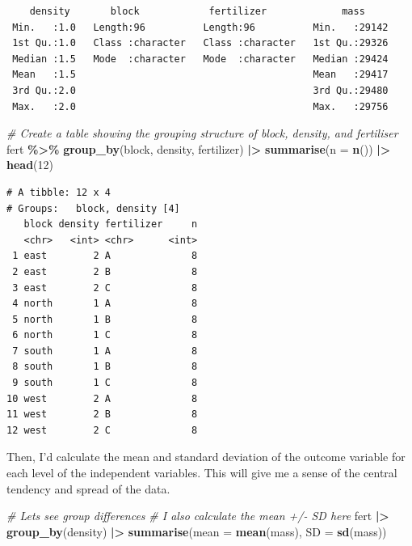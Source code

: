 \documentclass[
  10t,
]{article}
\newenvironment{Shaded}{\begin{snugshade}}{\end{snugshade}}
\newcommand{\AttributeTok}[1]{\textcolor[rgb]{0.13,0.29,0.53}{#1}}
\newcommand{\CommentTok}[1]{\textcolor[rgb]{0.56,0.35,0.01}{\textit{#1}}}
\newcommand{\DecValTok}[1]{\textcolor[rgb]{0.00,0.00,0.81}{#1}}
\newcommand{\FunctionTok}[1]{\textcolor[rgb]{0.13,0.29,0.53}{\textbf{#1}}}
\newcommand{\NormalTok}[1]{#1}
\newcommand{\SpecialCharTok}[1]{\textcolor[rgb]{0.81,0.36,0.00}{\textbf{#1}}}
\begin{document}
\begin{verbatim}
    density       block            fertilizer             mass      
 Min.   :1.0   Length:96          Length:96          Min.   :29142  
 1st Qu.:1.0   Class :character   Class :character   1st Qu.:29326  
 Median :1.5   Mode  :character   Mode  :character   Median :29424  
 Mean   :1.5                                         Mean   :29417  
 3rd Qu.:2.0                                         3rd Qu.:29480  
 Max.   :2.0                                         Max.   :29756  
\end{verbatim}

\begin{Shaded}
\begin{Highlighting}[]
\CommentTok{\# Create a table showing the grouping structure of block, density, and fertiliser}
\NormalTok{fert }\SpecialCharTok{\%\textgreater{}\%}
  \FunctionTok{group\_by}\NormalTok{(block, density, fertilizer) }\SpecialCharTok{|\textgreater{}} 
  \FunctionTok{summarise}\NormalTok{(}\AttributeTok{n =} \FunctionTok{n}\NormalTok{()) }\SpecialCharTok{|\textgreater{}} 
  \FunctionTok{head}\NormalTok{(}\DecValTok{12}\NormalTok{)}
\end{Highlighting}
\end{Shaded}

\begin{verbatim}
# A tibble: 12 x 4
# Groups:   block, density [4]
   block density fertilizer     n
   <chr>   <int> <chr>      <int>
 1 east        2 A              8
 2 east        2 B              8
 3 east        2 C              8
 4 north       1 A              8
 5 north       1 B              8
 6 north       1 C              8
 7 south       1 A              8
 8 south       1 B              8
 9 south       1 C              8
10 west        2 A              8
11 west        2 B              8
12 west        2 C              8
\end{verbatim}

Then, I'd calculate the mean and standard deviation of the outcome
variable for each level of the independent variables. This will give me
a sense of the central tendency and spread of the data.

\begin{Shaded}
\begin{Highlighting}[]
\CommentTok{\# Let\textquotesingle{}s see group differences}
\CommentTok{\# I also calculate the mean +/{-} SD here}
\NormalTok{fert }\SpecialCharTok{|\textgreater{}} 
  \FunctionTok{group\_by}\NormalTok{(density) }\SpecialCharTok{|\textgreater{}} 
  \FunctionTok{summarise}\NormalTok{(}\AttributeTok{mean =} \FunctionTok{mean}\NormalTok{(mass),}
            \AttributeTok{SD =} \FunctionTok{sd}\NormalTok{(mass))}
\end{Highlighting}
\end{Shaded}
\end{document}
